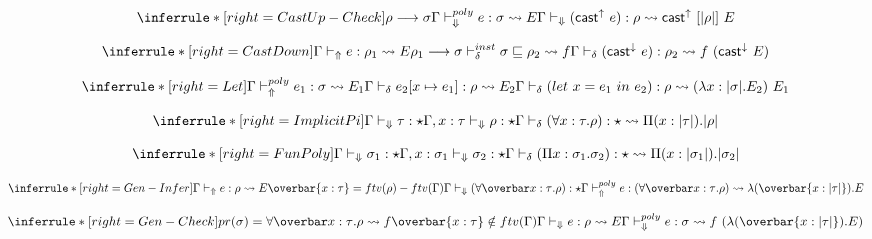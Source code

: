 \[
\inferrule*[right=CastUp-Check]
{ \rho \longrightarrow \sigma \\ \polycheck e : \sigma \transto{E} }
{\checktype (\castupe e) : \rho \transto{\castupe [\translated{\rho}]\ E}}
\]

\[
\inferrule*[right=CastDown]
{\infertype e : \rho_1 \transto{E}\\
\rho_1 \longrightarrow \sigma \\
\instinfercheck \sigma \sqsubseteq \rho_2\transto {f}}
{\infercheck (\castdowne e) : \rho_2 \transto {f\ (\castdowne E)}}
\]

\[
\inferrule*[right=Let]
{\polyinfer e_1 : \sigma \transto{E_1}\\
\infercheck e_2[\tpmapsto \sigma x {e_1}]: \rho \transto{E_2}
}
{\infercheck ( let\ x = e_1\ in\ e_2 ) : \rho \transto{(\lambda x:\translated \sigma. E_2)\ E_1}}
\]


\[
\inferrule*[right=ImplicitPi]
{\checktype \tau : \star \\ \Gamma, x:\tau \checktypeno \rho : \star}
{\infercheck (\forall x : \tau. \rho) : \star \transto {\Pi (x:\translated \tau). \translated \rho}}
\]


\[
\inferrule*[right=FunPoly]
{\checktype \sigma_1 : \star \\
\Gamma, x:\sigma_1 \checktypeno \sigma_2 : \star }
{\infercheck (\Pi x : \sigma_1. \sigma_2) : \star \transto{\Pi (x:\translated {\sigma_1}). \translated {\sigma_2}}}
\]


\[
\inferrule*[right=Gen-Infer]
{\infertype e :\rho \transto{E} \\ \overbar{x:\tau}=ftv(\rho)-ftv(\Gamma) \\
\checktype (\forallvars{x:\tau}. \rho):\star } {\polyinfer e :(\forallvars{x:\tau}. \rho) \transto{\lambda (\overbar{x:\translated \tau}). E}}
\]

\[
\inferrule*[right=Gen-Check]
{
pr(\sigma) = \forallvars{x:\tau}. \rho \transto{f} \\
\overbar{x:\tau} \notin ftv(\Gamma) \\
\checktype e :\rho \transto{E}
} {\polycheck e : \sigma \transto{f\ (\lambda (\overbar{x:\translated \tau}). E)}}
\]


